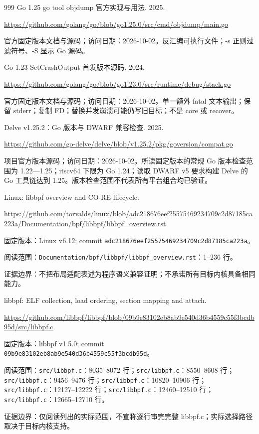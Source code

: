 \documentclass[UTF8,fontset=fandol,openany,11pt]{ctexbook}
\begin{document}
\begin{thebibliography}{999}
 Go 1.25 go tool objdump 官方实现与用法. 2025.\par
\url{https://github.com/golang/go/blob/go1.25.0/src/cmd/objdump/main.go}\par
{\small 官方固定版本文档与源码；访问日期：2026-10-02。反汇编可执行文件；-\allowbreak{}s 正则过滤符号、-\allowbreak{}S 显示 Go 源码。}

 Go 1.23 SetCrashOutput 首发版本源码. 2024.\par
\url{https://github.com/golang/go/blob/go1.23.0/src/runtime/debug/stack.go}\par
{\small 官方固定版本文档与源码；访问日期：2026-10-02。单一额外 fatal 文本输出；保留 stderr；复制 FD；替换并发崩溃可能仍写旧目标；不是 core 或 recover。}

 Delve v1.25.2：Go 版本与 DWARF 兼容检查. 2025.\par
\url{https://github.com/go-delve/delve/blob/v1.25.2/pkg/goversion/compat.go}\par
{\small 项目官方版本源码；访问日期：2026-10-02。所读固定版本的常规 Go 版本检查范围为 1.\allowbreak{}22—1.\allowbreak{}25；riscv64 下限为 Go 1.\allowbreak{}24；读取 DWARF v5 要求构建 Delve 的 Go 工具链达到 1.\allowbreak{}25。版本检查范围不代表所有平台组合均已验证。}

 Linux: libbpf overview and CO-RE lifecycle.\par
\url{https://github.com/torvalds/linux/blob/adc218676eef25575469234709c2d87185ca223a/Documentation/bpf/libbpf/libbpf_overview.rst}\par
{\small\raggedright 固定版本：Linux v6.12; commit \texttt{adc21867\allowbreak{}6eef2557\allowbreak{}54692347\allowbreak{}09c2d871\allowbreak{}85ca223a}。\par
阅读范围：\nolinkurl{Documentation/bpf/libbpf/libbpf_overview.rst}：1–236 行。\par
证据边界：不把布局适配表述为程序语义兼容证明；不承诺所有目标内核具备相同能力。
}

 libbpf: ELF collection, load ordering, section mapping and attach.\par
\url{https://github.com/libbpf/libbpf/blob/09b9e83102eb8ab9e540d36b4559c55f3bcdb95d/src/libbpf.c}\par
{\small\raggedright 固定版本：libbpf v1.5.0; commit \texttt{09b9e831\allowbreak{}02eb8ab9\allowbreak{}e540d36b\allowbreak{}4559c55f\allowbreak{}3bcdb95d}。\par
阅读范围：\nolinkurl{src/libbpf.c}：8035–8072 行；\nolinkurl{src/libbpf.c}：8550–8608 行；\nolinkurl{src/libbpf.c}：9456–9476 行；\nolinkurl{src/libbpf.c}：10820–10906 行；\nolinkurl{src/libbpf.c}：12127–12222 行；\nolinkurl{src/libbpf.c}：12460–12510 行；\nolinkurl{src/libbpf.c}：12665–12710 行。\par
证据边界：仅阅读列出的实际范围，不宣称逐行审完完整 libbpf.c；实际选择路径取决于目标内核支持。
}


\end{thebibliography}
\end{document}
